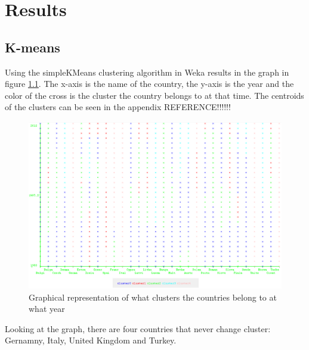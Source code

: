 \chapter{Results}
\label{Res}

\section{K-means}

Using the simpleKMeans clustering algorithm in Weka results in the graph in figure \ref{fig:clusters}. The x-axis is the name of the country, the y-axis is the year and the color of the cross is the cluster the country belongs to at that time. The centroids of the clusters can be seen in the appendix REFERENCE!!!!!!

\begin{figure}[h!]
  \centering
\includegraphics[width=\textwidth]{Appendix/Images/kMeans}
\caption{Graphical representation of what clusters the countries belong to at what year}
\label{fig:clusters}
\end{figure}

Looking at the graph, there are four countries that never change cluster: Gernamny, Italy, United Kingdom and Turkey.


